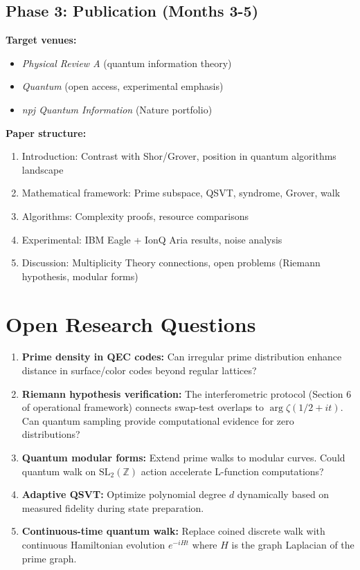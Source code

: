 \documentclass[11pt,letterpaper]{article}
\begin{document}
\subsection{Phase 3: Publication (Months 3-5)}

\textbf{Target venues:}
\begin{itemize}
\item \textit{Physical Review A} (quantum information theory)
\item \textit{Quantum} (open access, experimental emphasis)
\item \textit{npj Quantum Information} (Nature portfolio)
\end{itemize}

\textbf{Paper structure:}
\begin{enumerate}
\item Introduction: Contrast with Shor/Grover, position in quantum algorithms landscape
\item Mathematical framework: Prime subspace, QSVT, syndrome, Grover, walk
\item Algorithms: Complexity proofs, resource comparisons
\item Experimental: IBM Eagle + IonQ Aria results, noise analysis
\item Discussion: Multiplicity Theory connections, open problems (Riemann hypothesis, modular forms)
\end{enumerate}

\section{Open Research Questions}

\begin{enumerate}
\item \textbf{Prime density in QEC codes:} Can irregular prime distribution enhance distance in surface/color codes beyond regular lattices?

\item \textbf{Riemann hypothesis verification:} The interferometric protocol (Section 6 of operational framework) connects swap-test overlaps to $\arg \zeta(1/2 + it)$. Can quantum sampling provide computational evidence for zero distributions?

\item \textbf{Quantum modular forms:} Extend prime walks to modular curves. Could quantum walk on $\text{SL}_2(\mathbb{Z})$ action accelerate L-function computations?

\item \textbf{Adaptive QSVT:} Optimize polynomial degree $d$ dynamically based on measured fidelity during state preparation.

\item \textbf{Continuous-time quantum walk:} Replace coined discrete walk with continuous Hamiltonian evolution $e^{-iHt}$ where $H$ is the graph Laplacian of the prime graph.
\end{enumerate}
\end{document}
